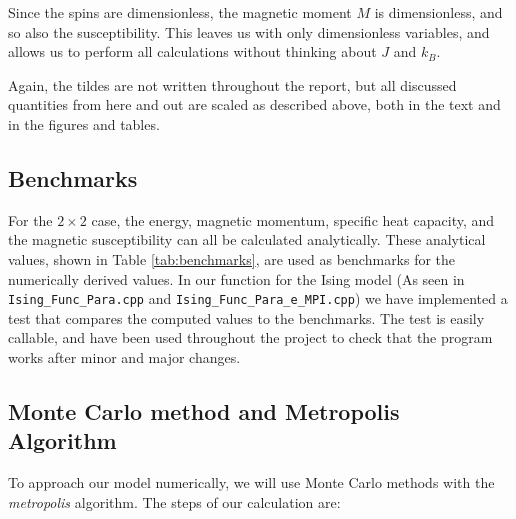 \documentclass[12pt,english,a4paper]{article}
\begin{document}
Since the spins are dimensionless, the magnetic moment $M$ is dimensionless, and so also the susceptibility. This leaves us with only dimensionless variables, and allows us to perform all calculations without thinking about $J$ and $k_B$.

Again, the tildes are not written throughout the report, but all discussed quantities from here and out are scaled as described above, both in the text and in the figures and tables.

\subsection{Benchmarks}

For the $2\times2$ case, the energy, magnetic momentum, specific heat capacity, and the magnetic susceptibility can all be calculated analytically. These analytical values, shown in Table \ref{tab:benchmarks}, are used as benchmarks for the numerically derived values. In our function for the Ising model (As seen in \texttt{Ising\_Func\_Para.cpp} and \texttt{Ising\_Func\_Para\_e\_MPI.cpp}) we have implemented a test that compares the computed values to the benchmarks. The test is easily callable, and have been used throughout the project to check that the program works after  minor and major changes. 

\subsection{Monte Carlo method and Metropolis Algorithm}

To approach our model numerically, we will use Monte Carlo methods with the \textit{metropolis} algorithm. The steps of our calculation are:
\end{document}
